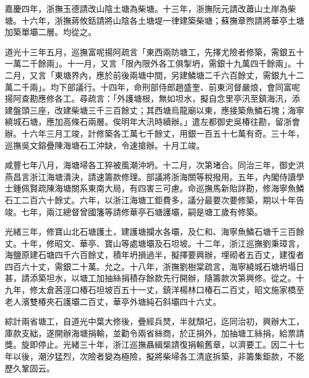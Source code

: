 \begin{pinyinscope}
嘉慶四年，浙撫玉德請改山陰土塘為柴塘。十三年，浙撫阮元請改蕭山土岸為柴塘。十六年，浙撫蔣攸銛請將山陰各土塘堤一律建築柴塘；蘇撫章煦請將華亭土塘加築單壩二層。均從之。

道光十三年五月，巡撫富呢揚阿疏言「東西兩防塘工，先擇尤險者修築，需銀五十一萬二千餘兩」。十一月，又言「限內限外各工俱掣坍，需銀十九萬四千餘兩」。十二月，又言「東塘界內，應於前後兩塘中間，另建鱗塘二千六百餘丈，需銀九十二萬二千兩」。均下部議行。十四年，命刑部侍郎趙盛奎、前東河督嚴烺，會同富呢揚阿查勘應修各工。尋疏言：「外護塘根，無如坦水，擬自念里亭汛至鎮海汛，添建盤頭三座，改建柴塘三千三百餘丈；其西塘烏龍廟以東，應接築魚鱗石塊；海寧繞城石塘，應加高條石兩層。俟明年大汛時續辦。」遣左都御史吳椿往勘，留浙會辦。十六年三月工竣，計修築各工萬七千餘丈，用銀一百五十七萬有奇。三十年，巡撫吳文鎔疊陳海塘石工沖缺，令速搶辦。十月工竣。

咸豐七年八月，海塘埽各工猝被風潮沖坍。十二月，次第堵合。同治三年，御史洪燕昌言浙江海塘潰決，請速籌款修理。部議將浙海關等稅撥用。五年，內閣侍讀學士鍾佩賢疏陳海塘關系東南大局，有四害三可慮。命巡撫馬新貽詳勘，修海寧魚鱗石工二百六十餘丈。六年，以浙江海塘工鉅費多，議分最要次要修築，期以十年告竣。七年，兩江總督曾國籓等請修華亭石塘護壩，嗣是塘工歲有修築。

光緒三年，修寶山北石塘護土，建護塘攔水各壩，及仁和、海寧魚鱗石塘千三百餘丈。十年，修昭文、華亭、寶山等處塘壩及石坦坡。十二年，浙江巡撫劉秉璋言，海鹽原建石塘四千六百餘丈，積年坍損過半，擬擇要興辦，埋砌者五百丈，建復者四百六十丈，需銀二十萬。允之。十八年，浙撫劉樹棠疏言，海寧繞城石塘坍塌日甚，請添築坦水，以塘工加抽絲捐積存餘款先行開辦，隨籌款次第興修。從之。十九年，修太倉茜涇口椿石坦坡百五十一丈，鎮洋楊林口椿石二百丈，昭文施家橋至老人濱雙椿夾石護壩二百丈，華亭外塘純石斜壩四十六丈。

綜計兩省塘工，自道光中葉大修後，疊經兵燹，半就頹圮，迄同治初，興辦大工，庫款支絀，遂開辦海塘捐輸，並勸令兩省絲商，於正捐外，加抽塘工絲捐，給票請獎。旋即停止。光緒三十年，浙江巡撫聶緝椝請復捐輸舊章，以濟要工。因二十七年以後，潮汐猛烈，次險者變為極險，擬將柴埽各工清底拆築，非籌集鉅款，不能歷久鞏固云。


\end{pinyinscope}